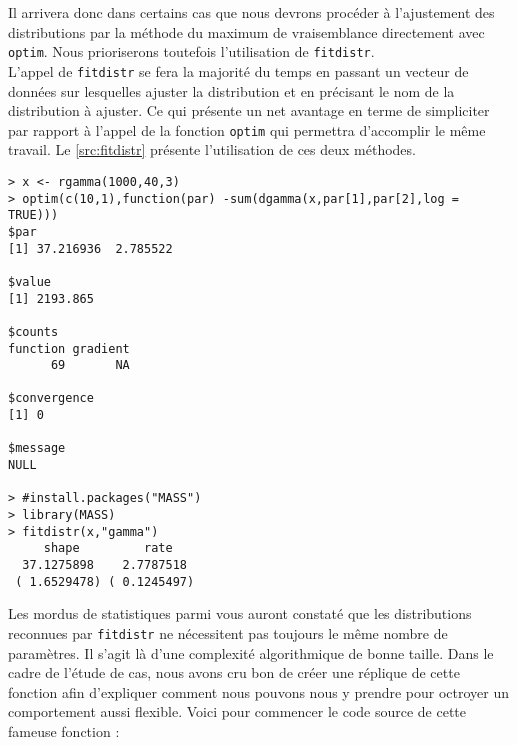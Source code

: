 Il arrivera donc dans certains cas que nous devrons procéder à l'ajustement des distributions par la méthode du maximum de vraisemblance directement avec \texttt{optim}. Nous prioriserons toutefois l'utilisation de \texttt{fitdistr}. \\

L'appel de \texttt{fitdistr} se fera la majorité du temps en passant un vecteur de données sur lesquelles ajuster la distribution et en précisant le nom de la distribution à ajuster. Ce qui présente un net avantage en terme de simpliciter par rapport à l'appel de la fonction \texttt{optim} qui permettra d'accomplir le même travail. Le \autoref{src:fitdistr} présente l'utilisation de ces deux méthodes. \\

\begin{lstlisting}[caption = Ajustement de distribution sur données empiriques,label=src:fitdistr]
> x <- rgamma(1000,40,3)
> optim(c(10,1),function(par) -sum(dgamma(x,par[1],par[2],log = TRUE)))
$par
[1] 37.216936  2.785522

$value
[1] 2193.865

$counts
function gradient 
      69       NA 

$convergence
[1] 0

$message
NULL

> #install.packages("MASS")
> library(MASS)
> fitdistr(x,"gamma")
     shape         rate   
  37.1275898    2.7787518 
 ( 1.6529478) ( 0.1245497)
\end{lstlisting}

Les mordus de statistiques parmi vous auront constaté que les distributions reconnues par \texttt{fitdistr} ne nécessitent pas toujours le même nombre de paramètres. Il s'agit là d'une complexité algorithmique de bonne taille. Dans le cadre de l'étude de cas, nous avons cru bon de créer une réplique de cette fonction afin d'expliquer comment nous pouvons nous y prendre pour octroyer un comportement aussi flexible. Voici pour commencer le code source de cette fameuse fonction : \\

